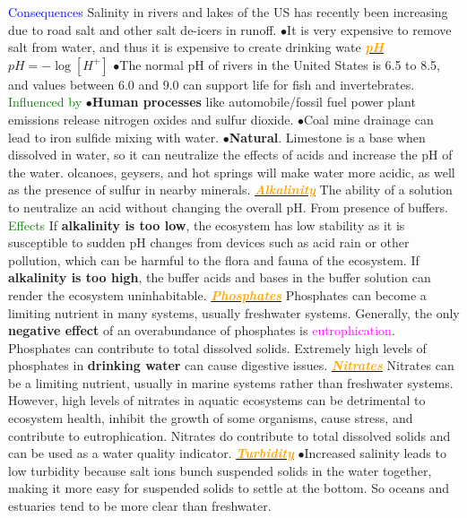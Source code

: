 \documentclass{article}
\newcommand{\ddd}{$\bullet$}
\newcommand{\green}[1]{\textcolor{green}{#1}}
\newcommand{\blue}[1]{\textcolor{blue}{#1}}
\newcommand{\pink}[1]{\textcolor{magenta}{#1}}
\newcommand{\orange}[1]{\textcolor{orange}{#1}}
\newcommand{\mysubsection}[1]{\underline{\textbf{{\textit{\orange{#1}}}}}}
\newcommand{\mysubsub}[1]{{{\green{#1}}}}
\newcommand{\mysubsubsub}[1]{{{\blue{#1}}}}
\begin{document}
\begin{multicols*}{4}
            \mysubsubsub{Consequences}
                Salinity in rivers and lakes of the US has recently been increasing due to road salt and other salt de-icers in runoff. \ddd It is very expensive to remove salt from water, and thus it is expensive to create drinking wate
        \mysubsection{pH}
            $pH = - \log [H^+]$
            \ddd  The normal pH of rivers in the United States is 6.5 to 8.5, and values between 6.0 and 9.0 can support life for fish and invertebrates.
            \mysubsub{Influenced by} 
            \ddd \textbf{Human processes} like automobile/fossil fuel power plant emissions release nitrogen oxides and sulfur dioxide.
            \ddd  Coal mine drainage can lead to iron sulfide mixing with water.
            \ddd \textbf{Natural}. Limestone is a base when dissolved in water, so it can neutralize the effects of acids and increase the pH of the water. olcanoes, geysers, and hot springs will make water more acidic, as well as the presence of sulfur in nearby minerals.
        \mysubsection{Alkalinity}
            The ability of a solution to neutralize an acid without changing the overall pH. From presence of buffers. 
            \mysubsub{Effects} If \textbf{alkalinity is too low}, the ecosystem has low stability as it is susceptible to sudden pH changes from devices such as acid rain or other pollution, which can be harmful to the flora and fauna of the ecosystem. If \textbf{alkalinity is too high}, the buffer acids and bases in the buffer solution can render the ecosystem uninhabitable.
        \mysubsection{Phosphates}
            Phosphates can become a limiting nutrient in many systems, usually freshwater systems. Generally, the only \textbf{negative effect} of an overabundance of phosphates is \pink{eutrophication}. Phosphates can contribute to total dissolved solids. Extremely high levels of phosphates in \textbf{drinking water} can cause digestive issues. 
        \mysubsection{Nitrates}
           Nitrates can be a limiting nutrient, usually in marine systems rather than freshwater systems. However, high levels of nitrates in aquatic ecosystems can be detrimental to ecosystem health, inhibit the growth of some organisms, cause stress, and contribute to eutrophication. Nitrates do contribute to total dissolved solids and can be used as a water quality indicator. 
        \mysubsection{Turbidity}
            \ddd Increased salinity leads to low turbidity because salt ions bunch suspended solids in the water together, making it more easy for suspended solids to settle at the bottom. So oceans and estuaries tend to be more clear than freshwater. 

\end{multicols*}
\end{document}
